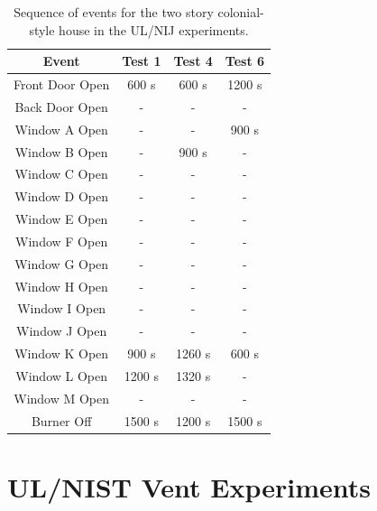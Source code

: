 \begin{table}[ht!]
\begin{center}
\begin{tabular}{|c||c|c|c|}
\hline
Event 			& Test 1  	& Test 4 	& Test 6 	\\ \hline \hline
Front Door Open & 600 s 	& 600 s 	& 1200 s 	\\ \hline
Back Door Open  & - 		& - 		& - 		\\ \hline
Window A Open  	& - 		& - 		& 900 s 	\\ \hline
Window B Open  	& - 		& 900 s 	& - 		\\ \hline
Window C Open  	& - 		& - 		& - 		\\ \hline
Window D Open  	& - 		& - 		& - 		\\ \hline
Window E Open  	& - 		& - 		& - 		\\ \hline
Window F Open  	& - 		& - 		& - 		\\ \hline
Window G Open  	& - 		& - 		& - 		\\ \hline
Window H Open  	& - 		& - 		& - 		\\ \hline
Window I Open  	& - 		& - 		& - 		\\ \hline
Window J Open  	& - 		& - 		& - 		\\ \hline
Window K Open  	& 900 s 	& 1260 s 	& 600 s 	\\ \hline
Window L Open  	& 1200 s 	& 1320 s 	& - 		\\ \hline
Window M Open  	& - 		& - 		& - 		\\ \hline
Burner Off 		& 1500 s 	& 1200 s 	& 1500 s 	\\ \hline
\end{tabular}
\end{center}
\caption[Sequence of events for the two story colonial-style house in the UL/NIJ experiments]
{Sequence of events for the two story colonial-style house in the UL/NIJ experiments.}
\label{Colonial_events}
\end{table}

\FloatBarrier

\section{UL/NIST Vent Experiments}
\label{UL_NIST_Vents_Description}

